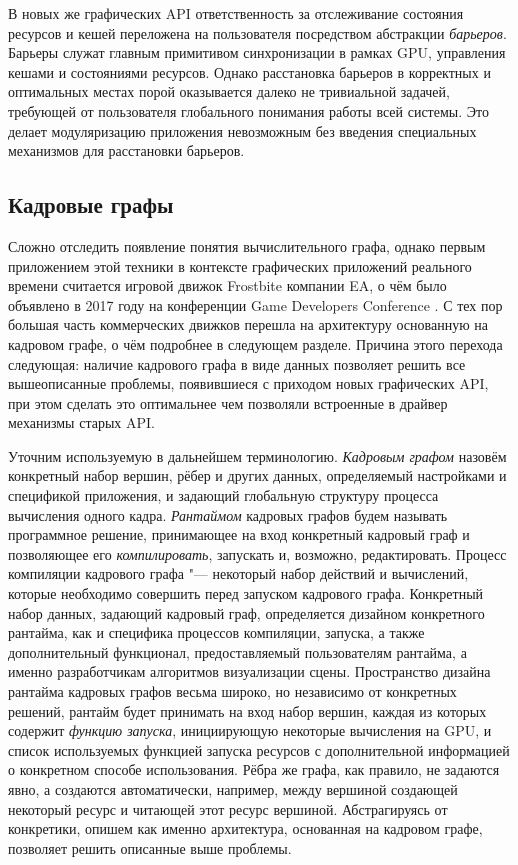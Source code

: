 В новых же графических API ответственность за отслеживание состояния ресурсов и кешей переложена на пользователя посредством абстракции \textit{барьеров}.
Барьеры служат главным примитивом синхронизации в рамках GPU, управления кешами и состояниями ресурсов.
Однако расстановка барьеров в корректных и оптимальных местах порой оказывается далеко не тривиальной задачей, требующей от пользователя глобального понимания работы всей системы.
Это делает модуляризацию приложения невозможным без введения специальных механизмов для расстановки барьеров.

\subsection{Кадровые графы}
Сложно отследить появление понятия вычислительного графа, однако первым приложением этой техники в контексте графических приложений реального времени считается игровой движок Frostbite компании EA, о чём было объявлено в 2017 году на конференции Game Developers Conference \cite{FrostbiteGdcTalk}.
С тех пор большая часть коммерческих движков перешла на архитектуру основанную на кадровом графе, о чём подробнее в следующем разделе.
Причина этого перехода следующая: наличие кадрового графа в виде данных позволяет решить все вышеописанные проблемы, появившиеся с приходом новых графических API, при этом сделать это оптимальнее чем позволяли встроенные в драйвер механизмы старых API.

Уточним используемую в дальнейшем терминологию.
\textit{Кадровым графом} назовём конкретный набор вершин, рёбер и других данных, определяемый настройками и спецификой приложения, и задающий глобальную структуру процесса вычисления одного кадра.
\textit{Рантаймом} кадровых графов будем называть программное решение, принимающее на вход конкретный кадровый граф и позволяющее его \textit{компилировать}, запускать и, возможно, редактировать.
Процесс компиляции кадрового графа "--- некоторый набор действий и вычислений, которые необходимо совершить перед запуском кадрового графа.
Конкретный набор данных, задающий кадровый граф, определяется дизайном конкретного рантайма, как и специфика процессов компиляции, запуска, а также дополнительный функционал, предоставляемый пользователям рантайма, а именно разработчикам алгоритмов визуализации сцены.
Пространство дизайна рантайма кадровых графов весьма широко, но независимо от конкретных решений, рантайм будет принимать на вход набор вершин, каждая из которых содержит \textit{функцию запуска}, инициирующую некоторые вычисления на GPU, и список используемых функцией запуска ресурсов с дополнительной информацией о конкретном способе использования.
Рёбра же графа, как правило, не задаются явно, а создаются автоматически, например, между вершиной создающей некоторый ресурс и читающей этот ресурс вершиной.
Абстрагируясь от конкретики, опишем как именно архитектура, основанная на кадровом графе, позволяет решить описанные выше проблемы.

